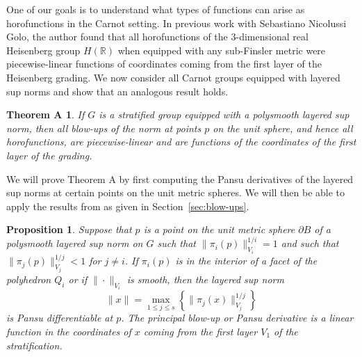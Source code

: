 \documentclass{article}
\newtheorem{prop}[theorem]{Proposition}
\newtheorem*{thma}{Theorem A}{\bf}{\it}
\theoremstyle{definition}
\newcommand{\norm}[1]{\|#1\|}
\newcommand{\R}{{\mathbb R}}
\begin{document}
One of our goals is to understand what types of functions can arise as horofunctions in the Carnot setting. In previous work with Sebastiano Nicolussi Golo, the author found that all horofunctions of the 3-dimensional real Heisenberg group $H(\R)$ when equipped with any sub-Finsler metric were piecewise-linear functions of coordinates coming from the first layer of the Heisenberg grading. We now consider all Carnot groups equipped with layered sup norms and show that an analogous result holds.


\begin{thma}
If $G$ is a stratified group equipped with a polysmooth layered sup norm, then all blow-ups of the norm at points $p$ on the unit sphere, and hence all horofunctions, are piecewise-linear and are functions of the coordinates of the first layer of the grading.
\label{thm:genPD}
\end{thma}

We will prove Theorem A by first computing the Pansu derivatives of the layered sup norms at certain points on the unit metric spheres. We will then be able to apply the results from \cite{FNG} as given in Section~\ref{sec:blow-ups}.

\begin{prop}\label{prop:pansuDiff} Suppose that $p$ is a point on the unit metric sphere $\partial B$ of a polysmooth layered sup norm on $G$ such that $\norm{\pi_i(p)}_{V_i}^{1/i} = 1$ and such that $\norm{\pi_j(p)}_{V_j}^{1/j} < 1$ for $j\neq i$. If $\pi_i(p)$ is in the interior of a facet of the polyhedron $Q_i$ or if $\norm{\cdot}_{V_i}$ is smooth, then the layered sup norm
\[
\norm{x} = \max_{1\leq j \leq s} \left\{\norm{\pi_j(x)}_{V_j}^{1/j}\right \}
\]
is Pansu differentiable at $p$. The principal blow-up or Pansu derivative is a linear function in the coordinates of $x$ coming from the first layer $V_1$ of the stratification.
\end{prop}
\end{document}
